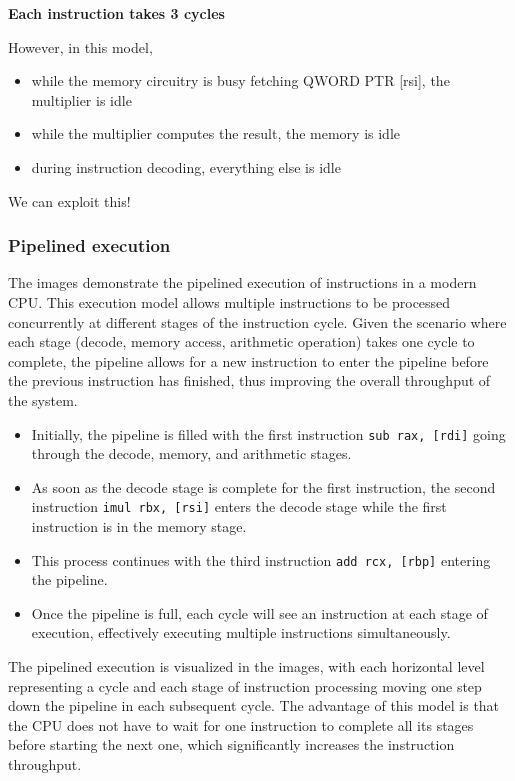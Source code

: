 \documentclass[12pt]{article}
\begin{document}
\textbf{Each instruction takes 3 cycles}

However, in this model,
\begin{itemize}
  \item while the memory circuitry is busy fetching QWORD PTR {[rsi]}, the multiplier is idle
  \item while the multiplier computes the result, the memory is idle
  \item during instruction decoding, everything else is idle
\end{itemize}
We can exploit this!
\subsubsection{Pipelined execution}

The images demonstrate the pipelined execution of instructions in a modern CPU. This execution model allows multiple instructions to be processed concurrently at different stages of the instruction cycle. Given the scenario where each stage (decode, memory access, arithmetic operation) takes one cycle to complete, the pipeline allows for a new instruction to enter the pipeline before the previous instruction has finished, thus improving the overall throughput of the system.

\begin{itemize}
    \item Initially, the pipeline is filled with the first instruction \texttt{sub rax, [rdi]} going through the decode, memory, and arithmetic stages.
    \item As soon as the decode stage is complete for the first instruction, the second instruction \texttt{imul rbx, [rsi]} enters the decode stage while the first instruction is in the memory stage.
    \item This process continues with the third instruction \texttt{add rcx, [rbp]} entering the pipeline.
    \item Once the pipeline is full, each cycle will see an instruction at each stage of execution, effectively executing multiple instructions simultaneously.
\end{itemize}

The pipelined execution is visualized in the images, with each horizontal level representing a cycle and each stage of instruction processing moving one step down the pipeline in each subsequent cycle. The advantage of this model is that the CPU does not have to wait for one instruction to complete all its stages before starting the next one, which significantly increases the instruction throughput.
\end{document}
